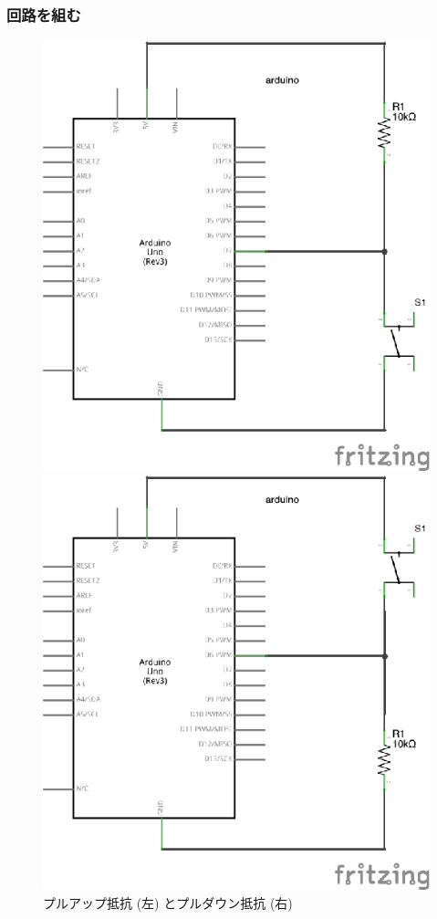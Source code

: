 \documentclass[11pt,a4paper]{jarticle}
\begin{document}
\subsubsection{回路を組む}
\begin{figure}[h!]
 \begin{minipage}{0.5\columnwidth}
  \centering
  \includegraphics[width=0.7\columnwidth]{img/pullup.eps}
 \end{minipage}
 \begin{minipage}{0.5\columnwidth}
  \centering
  \includegraphics[width=0.7\columnwidth]{img/pulldown.eps}
 \end{minipage}
  \caption{プルアップ抵抗 (左) とプルダウン抵抗 (右)}
\end{figure}
\end{document}
